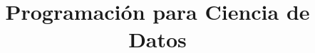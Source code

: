 

\title{Programación para Ciencia de Datos}
\newcommand{\code}[1]{\lb{\texttt{#1}}}

\maketitle

\thispagestyle{empty}

\tableofcontents

\thispagestyle{empty}

\newpage

\setcounter{page}{1}



